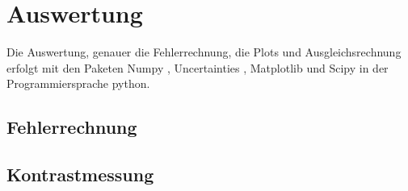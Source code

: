 \section{Auswertung}
Die Auswertung, genauer die Fehlerrechnung, die Plots und Ausgleichsrechnung erfolgt mit den Paketen
Numpy \cite{numpy}, Uncertainties \cite{uncertainties}, Matplotlib \cite{matplotlib} und Scipy \cite{scipy} in der Programmiersprache python.
\subsection{Fehlerrechnung}

\subsection{Kontrastmessung}

